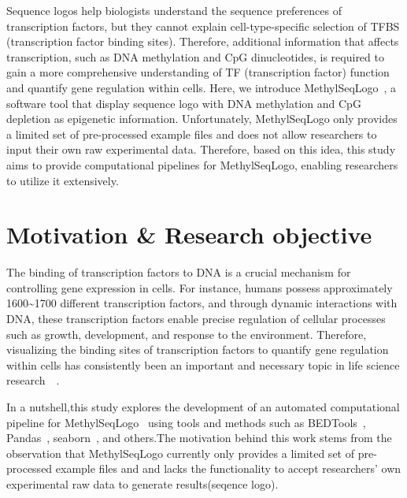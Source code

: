 \documentclass{PHlab-thesis}
\begin{document}
\indent Sequence logos help biologists understand the sequence preferences of transcription factors, but they cannot explain cell-type-specific selection of TFBS (transcription factor binding sites). Therefore, additional information that affects transcription, such as DNA methylation and CpG dinucleotides, is required to gain a more comprehensive understanding of TF (transcription factor) function and quantify gene regulation within cells. Here, we introduce MethylSeqLogo~\cite{Hsu2022.11.05.515271}, a software tool that display sequence logo with DNA methylation and CpG depletion as epigenetic information. Unfortunately, MethylSeqLogo only provides a limited set of pre-processed example files and does not allow researchers to input their own raw experimental data. Therefore, based on this idea, this study aims to provide computational pipelines for MethylSeqLogo, enabling researchers to utilize it extensively.

\section{Motivation \& Research objective}
The binding of transcription factors to DNA is a crucial mechanism for controlling gene expression in cells. For instance, humans possess approximately 1600\textasciitilde1700 different transcription factors, and through dynamic interactions with DNA, these transcription factors enable precise regulation of cellular processes such as growth, development, and response to the environment. Therefore, visualizing the binding sites of transcription factors to quantify gene regulation within cells has consistently been an important and necessary topic in life science research~\cite{vaquerizas2009census}~\cite{liu2017transcriptional}.

In a nutshell,this study explores the development of an automated computational pipeline for MethylSeqLogo~\cite{Hsu2022.11.05.515271} using tools and methods such as BEDTools~\cite{10.1093/bioinformatics/btq033}, Pandas~\cite{mckinney2010data}, seaborn~\cite{Waskom2021}, and others.The motivation behind this work stems from the observation that MethylSeqLogo currently only provides a limited set of pre-processed example files and and lacks the functionality to accept researchers' own experimental raw data to generate results(seqence logo).
\end{document}
